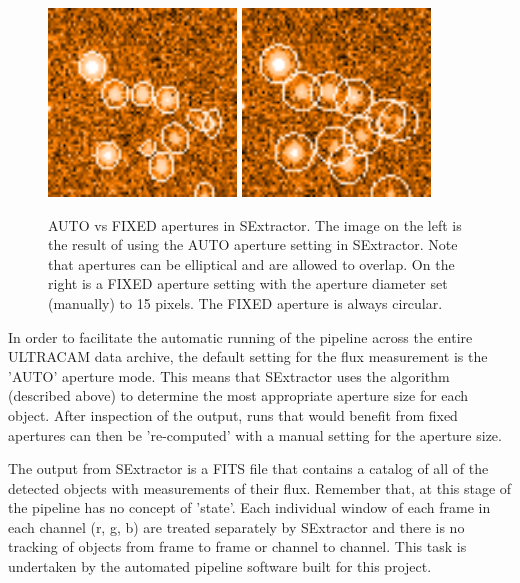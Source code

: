\begin{enumerate}
\begin{figure}
  \centering
  \includegraphics[width=50mm]{images/sex_apertures_auto_cropped.png}
  \includegraphics[width=50mm]{images/sex_apertures_fixed_cropped.png}
  \caption{AUTO vs FIXED apertures in SExtractor. The image on the left is the result of using the AUTO aperture setting in SExtractor. Note that apertures can be elliptical and are allowed to overlap. On the right is a FIXED aperture setting with the aperture diameter set (manually) to 15 pixels. The FIXED aperture is always circular.}
\label{fig:fixedautoapertures}
\end{figure}
\end{enumerate}

In order to facilitate the automatic running of the pipeline across the entire ULTRACAM data archive, the default setting for the flux measurement is the 'AUTO' aperture mode. This means that SExtractor uses the algorithm (described above) to determine the most appropriate aperture size for each object. After inspection of the output, runs that would benefit from fixed apertures can then be 're-computed' with a manual setting for the aperture size. 

The output from SExtractor is a FITS file that contains a catalog of all of the detected objects with measurements of their flux. Remember that, at this stage of the pipeline has no concept of 'state'. Each individual window of each frame in each channel (r, g, b) are treated separately by SExtractor and there is no tracking of objects from frame to frame or channel to channel. This task is undertaken by the automated pipeline software built for this project. 

